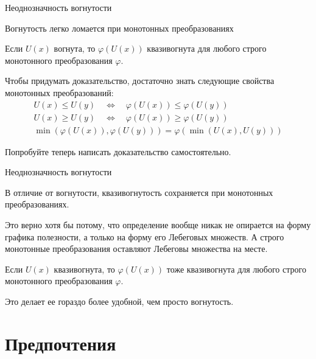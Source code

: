 \documentclass{beamer}
\begin{document}
\begin{frame}{Неоднозначность вогнутости}

Вогнутость легко ломается при монотонных преобразованиях

\begin{lemma}
Если $U(x)$ вогнута, то $\varphi(U(x))$ квазивогнута для любого строго монотонного преобразования $\varphi$. 
\end{lemma}

Чтобы придумать доказательство, достаточно знать следующие свойства монотонных преобразований:
 \begin{align*}
U(x) \leqslant U(y) \quad \Leftrightarrow \quad \varphi(U(x)) \leqslant \varphi(U(y))\\
U(x) \geqslant U(y) \quad \Leftrightarrow \quad \varphi(U(x)) \geqslant \varphi(U(y))\\
\min(\varphi(U(x)), \varphi(U(y))) = \varphi(\min(U(x),U(y)))
\end{align*}

Попробуйте теперь написать доказательство самостоятельно.

\end{frame}

\begin{frame}{Неоднозначность вогнутости}

В отличие от вогнутости, квазивогнутость сохраняется при монотонных преобразованиях.

Это верно хотя бы потому, что определение вообще никак не опирается на форму графика полезности, а только на форму его Лебеговых множеств. А \alert{строго монотонные преобразования оставляют Лебеговы множества на месте}.

\begin{lemma}
Если $U(x)$ квазивогнута, то $\varphi(U(x))$ тоже квазивогнута для любого строго монотонного преобразования $\varphi$. 
\end{lemma}

Это делает ее гораздо более удобной, чем просто вогнутость.

\end{frame}

\section{Предпочтения}
\end{document}
